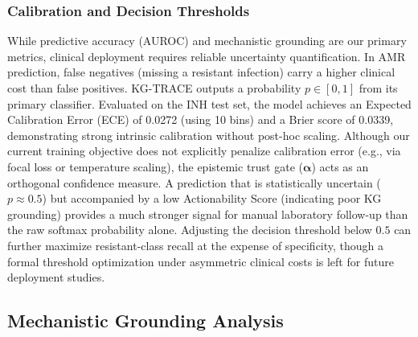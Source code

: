 \documentclass[conference]{IEEEtran}
\begin{document}
\begin{table}[ht]
\centering
\caption{Multi-Drug Extension Performance. Evaluated on the CRyPTIC \textit{M. tuberculosis} cohort.}
\label{tab:multidrug}
\end{table}

\subsubsection{Calibration and Decision Thresholds}
While predictive accuracy (AUROC) and mechanistic grounding are our primary metrics, clinical deployment requires reliable uncertainty quantification. In AMR prediction, false negatives (missing a resistant infection) carry a higher clinical cost than false positives. KG-TRACE outputs a probability $p \in [0, 1]$ from its primary classifier. Evaluated on the INH test set, the model achieves an Expected Calibration Error (ECE) of 0.0272 (using 10 bins) and a Brier score of 0.0339, demonstrating strong intrinsic calibration without post-hoc scaling. Although our current training objective does not explicitly penalize calibration error (e.g., via focal loss or temperature scaling), the epistemic trust gate ($\boldsymbol{\alpha}$) acts as an orthogonal confidence measure. A prediction that is statistically uncertain ($p \approx 0.5$) but accompanied by a low Actionability Score (indicating poor KG grounding) provides a much stronger signal for manual laboratory follow-up than the raw softmax probability alone. Adjusting the decision threshold below $0.5$ can further maximize resistant-class recall at the expense of specificity, though a formal threshold optimization under asymmetric clinical costs is left for future deployment studies.

\subsection{Mechanistic Grounding Analysis}\label{ssec:explain_results}
\end{document}
